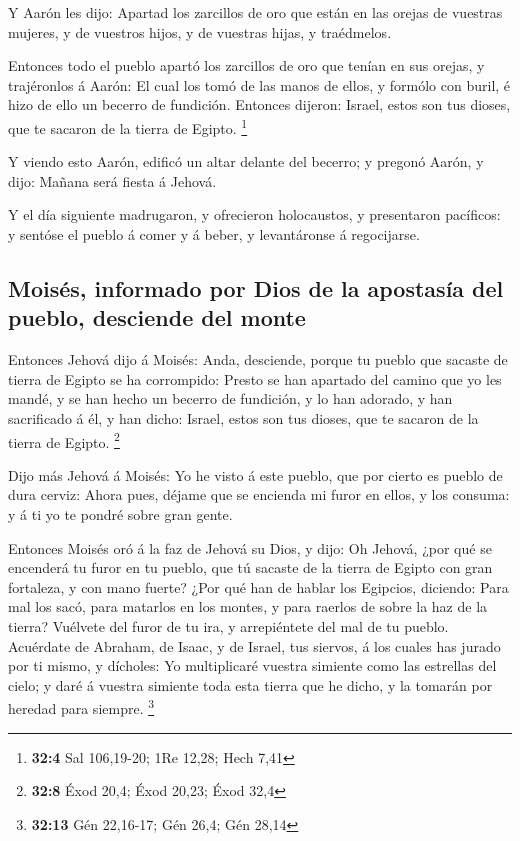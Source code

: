  Y Aarón les dijo: Apartad los zarcillos de oro que están en
las orejas de vuestras mujeres, y de vuestros hijos, y de vuestras
hijas, y traédmelos.

 Entonces todo el pueblo apartó los zarcillos de oro que
tenían en sus orejas, y trajéronlos á Aarón:  El cual los
tomó de las manos de ellos, y formólo con buril, é hizo de ello un
becerro de fundición. Entonces dijeron: Israel, estos son tus dioses,
que te sacaron de la tierra de Egipto. \footnote{\textbf{32:4} Sal
  106,19-20; 1Re 12,28; Hech 7,41}

 Y viendo esto Aarón, edificó un altar delante del becerro;
y pregonó Aarón, y dijo: Mañana será fiesta á Jehová.

 Y el día siguiente madrugaron, y ofrecieron holocaustos, y
presentaron pacíficos: y sentóse el pueblo á comer y á beber, y
levantáronse á regocijarse.

\hypertarget{moisuxe9s-informado-por-dios-de-la-apostasuxeda-del-pueblo-desciende-del-monte}{%
\subsection{Moisés, informado por Dios de la apostasía del pueblo,
desciende del
monte}\label{moisuxe9s-informado-por-dios-de-la-apostasuxeda-del-pueblo-desciende-del-monte}}

 Entonces Jehová dijo á Moisés: Anda, desciende, porque tu
pueblo que sacaste de tierra de Egipto se ha corrompido: 
Presto se han apartado del camino que yo les mandé, y se han hecho un
becerro de fundición, y lo han adorado, y han sacrificado á él, y han
dicho: Israel, estos son tus dioses, que te sacaron de la tierra de
Egipto. \footnote{\textbf{32:8} Éxod 20,4; Éxod 20,23; Éxod 32,4}

 Dijo más Jehová á Moisés: Yo he visto á este pueblo, que
por cierto es pueblo de dura cerviz:  Ahora pues, déjame
que se encienda mi furor en ellos, y los consuma: y á ti yo te pondré
sobre gran gente.

 Entonces Moisés oró á la faz de Jehová su Dios, y dijo: Oh
Jehová, ¿por qué se encenderá tu furor en tu pueblo, que tú sacaste de
la tierra de Egipto con gran fortaleza, y con mano fuerte? 
¿Por qué han de hablar los Egipcios, diciendo: Para mal los sacó, para
matarlos en los montes, y para raerlos de sobre la haz de la tierra?
Vuélvete del furor de tu ira, y arrepiéntete del mal de tu pueblo.
 Acuérdate de Abraham, de Isaac, y de Israel, tus siervos,
á los cuales has jurado por ti mismo, y dícholes: Yo multiplicaré
vuestra simiente como las estrellas del cielo; y daré á vuestra simiente
toda esta tierra que he dicho, y la tomarán por heredad para siempre.
\footnote{\textbf{32:13} Gén 22,16-17; Gén 26,4; Gén 28,14}

